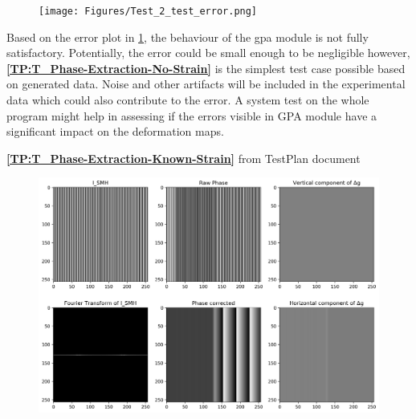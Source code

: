 \documentclass[12pt, titlepage]{article}
\begin{document}
\begin{figure}[H]
\begin{center}
\texttt{[image: Figures/Test\_2\_test\_error.png]}
\caption{}
\label{fig:Test_2_Test_error}
\end{center}
\end{figure}

Based on the error plot in \cref{fig:Test_2_Test_error}, the behaviour of the gpa module is not fully satisfactory. Potentially, the error could be small enough to be negligible however, \textbf{\cref{TP:T_Phase-Extraction-No-Strain}} is the simplest test case possible based on generated data. Noise and other artifacts will be included in the experimental data which could also contribute to the error. A system test on the whole program might help in assessing if the errors visible in GPA module have a significant impact on the deformation maps. \bigskip

\textbf{\cref{TP:T_Phase-Extraction-Known-Strain}} from TestPlan document

\begin{figure}[H]
\begin{center}
\includegraphics[scale=0.5]{Figures/Test_3_explanation.png}
\caption{}
\label{fig:Test_3_explaination}
\end{center}
\end{figure}
\end{document}
